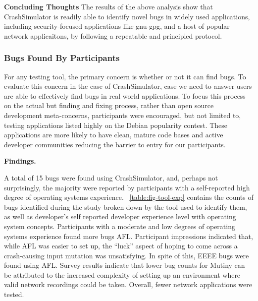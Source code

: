 {\bf Concluding Thoughts} The results of the above analysis show that
CrashSimulator is readily able to identify novel bugs in widely used
applications, including security-focused applications like gnu-gpg, and a host
of popular network applicaitons, by following a repeatable and principled
protocol.

\subsubsection{Bugs Found By Participants}

For any testing tool, the primary concern is whether or not it can find
bugs.  To evaluate this concern in the case of CrashSimulator, case we need
to answer users are able to effectively find bugs in real world
applications.  To focus this process on the actual but finding and fixing
process, rather than open source development meta-concerns, participants
were encouraged, but not limited to, testing applications listed highly on
the Debian popularity contest.  These applications are more likely to have
clean, mature code bases and active developer communities reducing the
barrier to entry for our participants.

{\bf Findings. }

A total of 15 bugs were found using CrashSimulator, and, perhaps not
surprisingly, the majority were reported by participants with a
self-reported high degree of operating systems experience.
~\ref{table:fig-tool-exp} contains the
counts of bugs identified during the study broken down by
the tool used to identify them, as well as developer's self reported
developer experience level with operating system concepts.
Participants with a moderate and low degrees of operating
systems experience found more bugs AFL.  Participant impressions indicated
that, while AFL was easier to set up, the ``luck'' aspect of hoping to come
across a crash-causing input mutation was unsatisfying.  In spite of this,
EEEE bugs were found using AFL.  Survey results indicate that lower bug
counts for Mutiny can be attributed to the increased complexity of setting
up an environment where valid network recordings could be taken.  Overall,
fewer network applications were tested.

